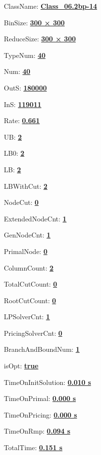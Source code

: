 \documentclass[11pt]{article}
\begin{document}
\pagestyle{empty}


ClassName: \underline{\textbf{Class_06.2bp-14}}
\par
BinSize: \underline{\textbf{300 × 300}}
\par
ReduceSize: \underline{\textbf{300 × 300}}
\par
TypeNum: \underline{\textbf{40}}
\par
Num: \underline{\textbf{40}}
\par
OutS: \underline{\textbf{180000}}
\par
InS: \underline{\textbf{119011}}
\par
Rate: \underline{\textbf{0.661}}
\par
UB: \underline{\textbf{2}}
\par
LB0: \underline{\textbf{2}}
\par
LB: \underline{\textbf{2}}
\par
LBWithCut: \underline{\textbf{2}}
\par
NodeCut: \underline{\textbf{0}}
\par
ExtendedNodeCnt: \underline{\textbf{1}}
\par
GenNodeCnt: \underline{\textbf{1}}
\par
PrimalNode: \underline{\textbf{0}}
\par
ColumnCount: \underline{\textbf{2}}
\par
TotalCutCount: \underline{\textbf{0}}
\par
RootCutCount: \underline{\textbf{0}}
\par
LPSolverCnt: \underline{\textbf{1}}
\par
PricingSolverCnt: \underline{\textbf{0}}
\par
BranchAndBoundNum: \underline{\textbf{1}}
\par
isOpt: \underline{\textbf{true}}
\par
TimeOnInitSolution: \underline{\textbf{0.010 s}}
\par
TimeOnPrimal: \underline{\textbf{0.000 s}}
\par
TimeOnPricing: \underline{\textbf{0.000 s}}
\par
TimeOnRmp: \underline{\textbf{0.094 s}}
\par
TotalTime: \underline{\textbf{0.151 s}}
\par
\newpage
\end{document}
